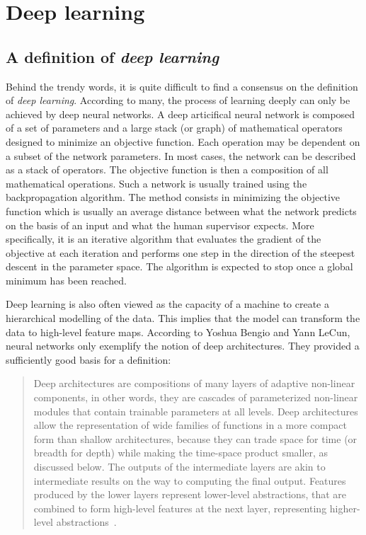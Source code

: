 \section{Deep learning}

    \subsection{A definition of \textit{deep learning}}

        Behind the trendy words, it is quite difficult to find a consensus on the definition of \textit{deep learning}. According to many, the process of learning 
        deeply can only be achieved by deep neural networks. A deep articifical neural network is composed of a set of parameters and a large stack 
        (or graph) of mathematical operators designed to minimize an objective function.
        Each operation may be dependent on a subset of the network parameters.
        In most cases, the network can be described as a stack of operators. 
        The objective function is then a composition of all mathematical operations. Such a network is usually trained using the 
        backpropagation algorithm. The method consists in minimizing the objective function which is usually an average distance between what the network
        predicts on the basis of an input and what the human supervisor expects. More specifically, it is an iterative algorithm that evaluates the gradient of the 
        objective at each iteration and performs one step in the direction of the steepest descent in the parameter space. The algorithm is expected to stop
        once a global minimum has been reached.

        Deep learning is also often viewed as the capacity of a machine to create a hierarchical modelling of the data.
        This implies that the model can transform the data to high-level feature maps.
        According to Yoshua Bengio and Yann LeCun, neural networks only exemplify the notion of deep
        architectures. They provided a sufficiently good basis for a definition:

        \begin{quotation}
            Deep architectures are compositions of many layers of adaptive non-linear components,
            in other words, they are cascades of parameterized non-linear modules that contain
            trainable parameters at all levels. Deep architectures allow the representation of wide
            families of functions in a more compact form than shallow architectures, because they
            can trade space for time (or breadth for depth) while making the time-space product
            smaller, as discussed below. The outputs of the intermediate layers are akin to intermediate
            results on the way to computing the final output. Features produced by the lower
            layers represent lower-level abstractions, that are combined to form high-level features
            at the next layer, representing higher-level abstractions~\cite{40d5d7fd62cb44ba934a8a75d4b2b076}.
        \end{quotation}

